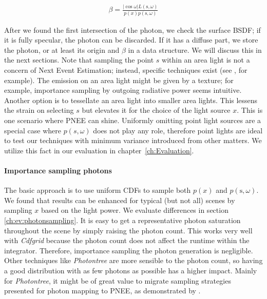 \begin{align}\label{eq:beta}
\beta = \frac{|\cos{\omega}|L(\text{s}, \omega)}{p(x)p(\text{s}, \omega)}
\end{align}

 After we found the first intersection of the photon, we check the surface BSDF; if it is fully specular, the photon can be discarded. If it has a diffuse part, we store the photon, or at least its origin and $\beta$ in a data structure. We will discuss this in the next sections. Note that sampling the point $s$ within an area light is not a concern of Next Event Estimation; instead, specific techniques exist (see \parencite{Shirley:1996:MCT:226150.226151, DBLP:journals/cgf/UrenaFK13, DBLP:journals/corr/abs-1805-09048, DBLP:journals/cgf/KokJ92}, for example). The emission on an area light might be given by a texture; for example, importance sampling by outgoing radiative power seems intuitive. Another option is to tessellate an area light into smaller area lights. This lessens the strain on selecting $s$ but elevates it for the choice of the light source $x$. This is one scenario where PNEE can shine. Uniformly omitting point light sources are a special case where $p(s,\omega)$ does not play any role, therefore point lights are ideal to test our techniques with minimum variance introduced from other matters. We utilize this fact in our evaluation in chapter~\ref{ch:Evaluation}.

\paragraph{Importance sampling photons}
\label{ch:photonimportancesample}

The basic approach is to use uniform CDFs to sample both $p(x)$ and $p(\text{s}, \omega)$. We found that results can be enhanced for typical (but not all) scenes by sampling $x$ based on the light power. We evaluate differences in section \ref{ch:ev:photonsampling}. It is easy to get a representative photon saturation throughout the scene by simply raising the photon count. This works very well with \textit{Cdfgrid} because the photon count does not affect the runtime within the integrator. Therefore, importance sampling the photon generation is negligible. Other techniques like \textit{Photontree} are more sensible to the photon count, so having a good distribution with as few photons as possible has a higher impact. Mainly for \textit{Photontree}, it might be of great value to migrate sampling strategies presented for photon mapping to PNEE, as demonstrated by \textcite{DBLP:conf/rt/PeterP98, DBLP:conf/rt/SuykensW00, DBLP:journals/vc/ZhengZ15}.

